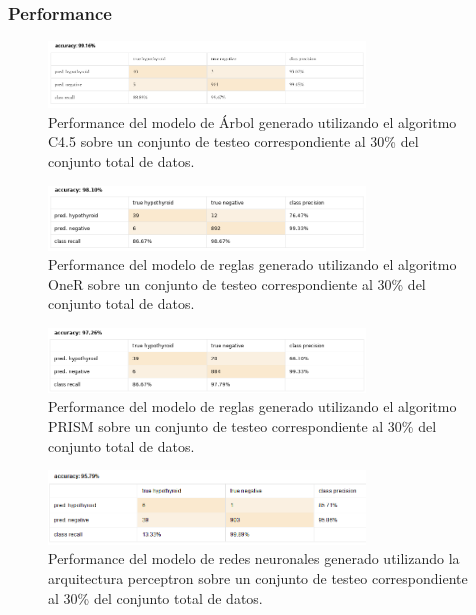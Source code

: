\documentclass[osajnl,twocolumn,showpacs,superscriptaddress,10pt,floatfix]{revtex4-1} %
\begin{document}
\subsubsection{Performance} \label{apendix:models:performance}

\begin{figure}[h]
    \centering
    \includegraphics[width=0.75\textwidth]{models/w_j48_performance}
    \caption{Performance del modelo de Árbol generado utilizando el algoritmo C4.5 sobre un conjunto de testeo correspondiente al 30\% del conjunto total de datos.}
    \label{figure:w_j48_performance}
\end{figure}

\begin{figure}[h]
    \centering
    \includegraphics[width=0.75\textwidth]{models/w_oneR_performance}
    \caption{Performance del modelo de reglas generado utilizando el algoritmo OneR sobre un conjunto de testeo correspondiente al 30\% del conjunto total de datos.}
    \label{figure:w_oneR_performance}
\end{figure}

\begin{figure}[h]
    \centering
    \includegraphics[width=0.75\textwidth]{models/prism_performance}
    \caption{Performance del modelo de reglas generado utilizando el algoritmo PRISM sobre un conjunto de testeo correspondiente al 30\% del conjunto total de datos.}
    \label{figure:prism_performance}
\end{figure}

\begin{figure}[h]
    \centering
    \includegraphics[width=0.75\textwidth]{models/perceptron_performance}
    \caption{Performance del modelo de redes neuronales generado utilizando la arquitectura perceptron sobre un conjunto de testeo correspondiente al 30\% del conjunto total de datos.}
    \label{figure:perceptron_performance}
\end{figure}
\end{document}
